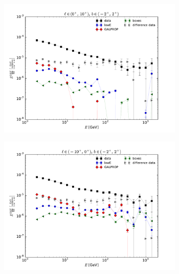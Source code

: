 \begin{figure}
{		\begin{subfigure}[b]{.4\textwidth}
		\centering \includegraphics[width=.95\textwidth]{plots/SED_all_left-right__l=5_b=0.pdf}
		\end{subfigure}%
		\begin{subfigure}[b]{.4\textwidth}
		\centering \includegraphics[width=.95\textwidth]{plots/SED_all_left-right__l=-5_b=0.pdf}
	\end{subfigure}%
}
\vspace*{-0.2cm}
\end{figure}
